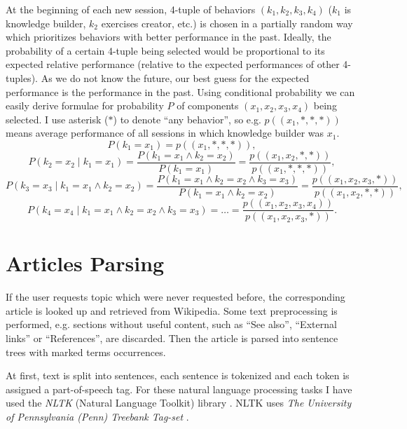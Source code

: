 \documentclass[12pt, twoside]{fithesis2}		%
\renewcommand{\_}{\leavevmode \kern0.07em\vbox{\hrule width0.4em}}
\begin{document}
At the beginning of each new session, 4-tuple of behaviors $(k_1, k_2, k_3, k_4)$ ($k_1$ is knowledge builder, $k_2$ exercises creator, etc.) is chosen in a partially random way
which prioritizes behaviors with better performance in the past.
Ideally, the probability of a certain 4-tuple being selected would be proportional to its expected relative performance
(relative to the expected performances of other 4-tuples).
As we do not know the future, our best guess for the expected performance is the performance in the past.
Using conditional probability we can easily derive formulae for probability $P$ of components $(x_1, x_2, x_3, x_4)$ being selected.
I use asterisk ($*$) to denote ``any behavior'', so e.g. $p((x_1, *, *, *))$ means average performance of all sessions in which knowledge builder was $x_1$.
$$
P(k_1 = x_1) = p((x_1, *, *, *)),
$$
$$
P(k_2 = x_2 \mid k_1 = x_1)
  = \frac{P(k_1 = x_1 \land k_2 = x_2)}{P(k_1 = x_1)}
  = \frac{p((x_1, x_2, *, *))}{p((x_1, *, *, *))},
$$
$$
P(k_3 = x_3 \mid k_1 = x_1 \land k_2 = x_2)
  = \frac{P(k_1 = x_1 \land k_2 = x_2 \land k_3 = x_3)}{P(k_1 = x_1 \land k_2 = x_2)}
  = \frac{p((x_1, x_2, x_3, *))}{p((x_1, x_2, *, *))},
$$
$$
P(k_4 = x_4 \mid k_1 = x_1 \land k_2 = x_2 \land k_3 = x_3)
  = \ldots
  = \frac{p((x_1, x_2, x_3, x_4))}{p((x_1, x_2, x_3, *))}.
$$



\section{Articles Parsing}
\label{sec:articles-parsing}

If the user requests topic which were never requested before,
the corresponding article is looked up and retrieved from Wikipedia.
Some text preprocessing is performed, e.g. sections without useful content, such as ``See also'', ``External links'' or ``References'', are discarded.
Then the article is parsed into sentence trees with marked terms occurrences.

At first, text is split into sentences, each sentence is tokenized
and each token is assigned a part-of-speech tag.
    For these natural language processing tasks I have used the \textit{NLTK} (Natural Language Toolkit) library \cite{nlp-python}. NLTK uses \textit{The University of Pennsylvania (Penn) Treebank Tag-set} \cite{penn-tagset}.
\end{document}
